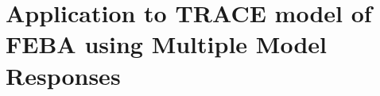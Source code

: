 \section{Application to TRACE model of FEBA using Multiple Model Responses}\label{sec:bayes_application_to_feba_multivariate}